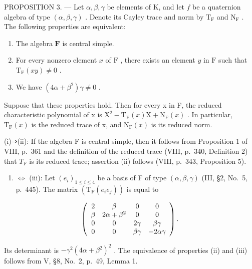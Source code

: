 PROPOSITION 3. --- Let \(\alpha, \beta, \gamma\) be elements of K, and let \(f\) be a quaternion algebra of type \((\alpha, \beta, \gamma)\) . Denote its Cayley trace and norm by \(\mathrm{T}_{\mathrm{F}}\) and \(\mathrm{N}_{\mathrm{F}}\) . The following properties are equivalent:

\begin{enumerate}
\def\labelenumi{(\roman{enumi})}
\item
  The algebra \(\mathbf{F}\) is central simple.
\item
  For every nonzero element \(x\) of \(\mathrm{F}\) , there exists an element \(y\) in \(\mathrm{F}\) such that \(\mathrm{T}_{\mathrm{F}}(xy) \neq 0\) .
\item
  We have \((4\alpha + \beta^{2})\gamma \neq 0\) .
\end{enumerate}

Suppose that these properties hold. Then for every x in F, the reduced characteristic polynomial of x is \(\mathrm{X}^{2}-\mathrm{T}_{\mathrm{F}}(x)\mathrm{X}+\mathrm{N}_{\mathrm{F}}(x)\) . In particular, \(\mathrm{T}_{\mathrm{F}}(x)\) is the reduced trace of x, and \(\mathrm{N}_{\mathrm{F}}(x)\) is its reduced norm.

(i)⇒(ii): If the algebra F is central simple, then it follows from Proposition 1 of VIII, p.~361 and the definition of the reduced trace (VIII, p.~340, Definition 2) that \(T_{F}\) is its reduced trace; assertion (ii) follows (VIII, p.~343, Proposition 5).

\begin{enumerate}
\def\labelenumi{(\roman{enumi})}
\setcounter{enumi}{1}
\tightlist
\item
  \(\Leftrightarrow\) (iii): Let \((e_i)_{1\leqslant i\leqslant 4}\) be a basis of F of type \((\alpha ,\beta ,\gamma)\) (III, §2, No.~5, p.~445). The matrix \((\mathrm{T_F}(e_i e_j))\) is equal to
\end{enumerate}

\[
\left( \begin{array}{c c c c} 2 & \beta & 0 & 0 \\ \beta & 2 \alpha + \beta^ {2} & 0 & 0 \\ 0 & 0 & 2 \gamma & \beta \gamma \\ 0 & 0 & \beta \gamma & - 2 \alpha \gamma \end{array} \right).
\]

Its determinant is \(-\gamma^{2}(4\alpha + \beta^{2})^{2}\) . The equivalence of properties (ii) and (iii) follows from V, §8, No.~2, p.~49, Lemma 1.

